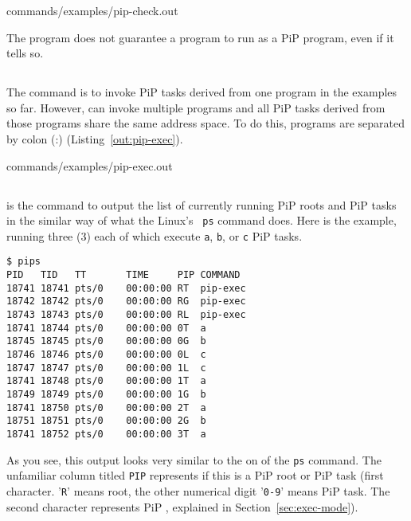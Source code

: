 
                {commands/examples/pip-check.out}

The  program does not guarantee a program to
run as a PiP program, even if it tells so. 

\subsection{}

The  command is to invoke PiP tasks derived
from one program in the examples so far. However, 
can invoke multiple programs and all PiP tasks derived from those
programs share the same address space. To do this, programs are
separated by colon (:) (Listing~\ref{out:pip-exec}).


                {commands/examples/pip-exec.out}

\subsection{}\label{sec:pips}

 is the command to output the list of currently running
PiP roots and PiP tasks in the similar way of what the Linux's {\tt
  ps} command does. Here is the example, running three (3)
 each of which execute {\tt a}, {\tt b}, or {\tt c}
PiP tasks. 

\begin{lstlisting}[frame=tRBl]
$ pips
PID   TID   TT       TIME     PIP COMMAND
18741 18741 pts/0    00:00:00 RT  pip-exec
18742 18742 pts/0    00:00:00 RG  pip-exec
18743 18743 pts/0    00:00:00 RL  pip-exec
18741 18744 pts/0    00:00:00 0T  a
18745 18745 pts/0    00:00:00 0G  b
18746 18746 pts/0    00:00:00 0L  c
18747 18747 pts/0    00:00:00 1L  c
18741 18748 pts/0    00:00:00 1T  a
18749 18749 pts/0    00:00:00 1G  b
18741 18750 pts/0    00:00:00 2T  a
18751 18751 pts/0    00:00:00 2G  b
18741 18752 pts/0    00:00:00 3T  a
\end{lstlisting}

As you see, this output looks very similar to the on of the {\tt ps}
command. The unfamiliar column titled {\tt PIP} represents
if this is a PiP root or PiP task (first character. '{\tt R}' means
root, the other numerical digit '{\tt 0-9}' means PiP task. The second
character represents PiP , explained in
Section~\ref{sec:exec-mode}).

